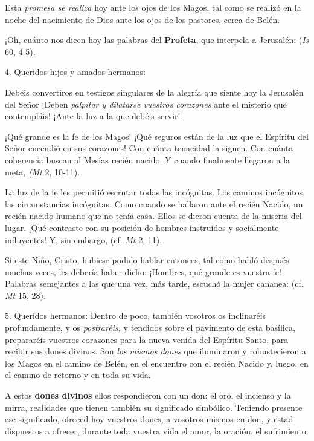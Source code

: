 \begin{body}
\begin{body}
Esta \emph{promesa se realiza} hoy ante los ojos de los Magos, tal como se realizó en la noche del nacimiento de Dios ante los ojos de los pastores, cerca de Belén.

¡Oh, cuánto nos dicen hoy las palabras del \textbf{Profeta}, que interpela a Jerusalén:  (\emph{Is} 60, 4-5).

4. Queridos hijos y amados hermanos:

Debéis convertiros en testigos singulares de la alegría que siente hoy la Jerusalén del Señor ¡Deben \emph{palpitar y dilatarse vuestros corazones} ante el misterio que contempláis! ¡Ante la luz a la que debéis servir!

¡Qué grande es la fe de los Magos! ¡Qué seguros están de la luz que el Espíritu del Señor encendió en sus corazones! Con cuánta tenacidad la siguen. Con cuánta coherencia buscan al Mesías recién nacido. Y cuando finalmente llegaron a la meta,  \emph{(Mt} 2, 10-11).

La luz de la fe les permitió escrutar todas las incógnitas. Los caminos incógnitos. las circunstancias incógnitas. Como cuando se hallaron ante el recién Nacido, un recién nacido humano que no tenía casa. Ellos se dieron cuenta de la miseria del lugar. ¡Qué contraste con su posición de hombres instruidos y socialmente influyentes! Y, sin embargo,  (cf. \emph{Mt} 2, 11).

Si este Niño, Cristo, hubiese podido hablar entonces, tal como habló después muchas veces, les debería haber dicho: ¡Hombres, qué grande es vuestra fe! Palabras semejantes a las que una vez, más tarde, escuchó la mujer cananea:  (cf. \emph{Mt} 15, 28).

5. Queridos hermanos: Dentro de poco, también vosotros os inclinaréis profundamente, y os \emph{postraréis,} y tendidos sobre el pavimento de esta basílica, prepararéis vuestros corazones para la nueva venida del Espíritu Santo, para recibir sus dones divinos. Son \emph{los mismos dones} que iluminaron y robustecieron a los Magos en el camino de Belén, en el encuentro con el recién Nacido y, luego, en el camino de retorno y en toda su vida.

A estos \textbf{dones divinos} ellos respondieron con un don: el oro, el incienso y la mirra, realidades que tienen también su significado simbólico. Teniendo presente ese significado, ofreced hoy vuestros dones, a vosotros mismos en don, y estad dispuestos a ofrecer, durante toda vuestra vida el amor, la oración, el sufrimiento.


\end{body}
\end{body}
